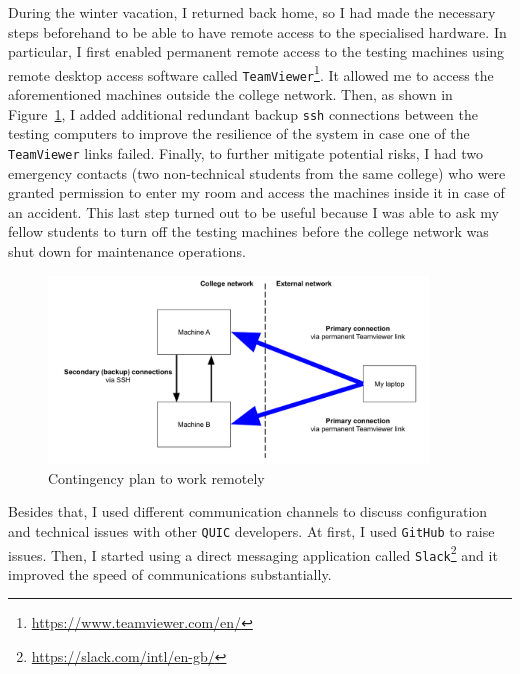\documentclass[12pt,a4paper,twoside,openright]{report}
\begin{document}
    During the winter vacation, I returned back home, so I had made the necessary steps beforehand to be able to have remote access to the specialised hardware.
    In particular, I first enabled permanent remote access to the testing machines using remote desktop access software called \texttt{TeamViewer}\footnote{\url{https://www.teamviewer.com/en/}}.
    It allowed me to access the aforementioned machines outside the college network.
    Then, as shown in Figure~\ref{fig:setup_map}, I added additional redundant backup \texttt{ssh} connections between the testing computers to improve the resilience of the system in case one of the \texttt{TeamViewer} links failed.
    Finally, to further mitigate potential risks, I had two emergency contacts (two non-technical students from the same college) who were granted permission to enter my room and access the machines inside it in case of an accident.
    This last step turned out to be useful because I was able to ask my fellow students to turn off the testing machines before the college network was shut down for maintenance operations.
    

    \begin{figure}[ht]
    \centering
    \includegraphics[width=0.9\textwidth]{figs/Setup map.png}
    \caption[Contingency plan to work remotely]{Contingency plan to work remotely}
    \label{fig:setup_map}
    \end{figure}

    Besides that, I used different communication channels to discuss configuration and technical issues with other \texttt{QUIC} developers.
    At first, I used \texttt{GitHub} to raise issues.
    Then, I started using a direct messaging application called \texttt{Slack}\footnote{\url{https://slack.com/intl/en-gb/}} 
    and it improved the speed of communications substantially.
\end{document}
